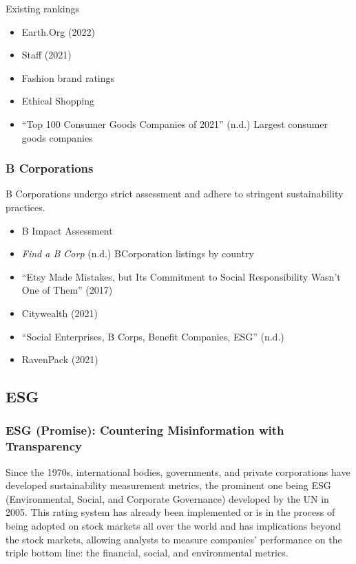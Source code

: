\documentclass[
  letterpaper,
  DIV=11,
  numbers=noendperiod]{scrartcl}
\providecommand{\tightlist}{%
  \setlength{\itemsep}{0pt}\setlength{\parskip}{0pt}}\usepackage{longtable,booktabs,array}
\begin{document}
Existing rankings

\begin{itemize}
\tightlist
\item
  Earth.Org (2022)
\item
  Staff (2021)
\item
  Fashion brand ratings
\item
  Ethical Shopping
\item
  {``Top 100 {Consumer Goods Companies} of 2021''} (n.d.) Largest
  consumer goods companies
\end{itemize}

\subsubsection{B Corporations}\label{b-corporations}

B Corporations undergo strict assessment and adhere to stringent
sustainability practices.

\begin{itemize}
\item
  B Impact Assessment
\item
  \emph{Find a {B Corp}} (n.d.) BCorporation listings by country
\item
  {``Etsy Made Mistakes, but Its Commitment to Social Responsibility
  Wasn't One of Them''} (2017)
\item
  Citywealth (2021)
\item
  {``Social {Enterprises}, {B Corps}, {Benefit Companies}, {ESG}''}
  (n.d.)
\item
  RavenPack (2021)
\end{itemize}

\subsection{ESG}\label{esg}

\subsubsection{ESG (Promise): Countering Misinformation with
Transparency}\label{esg-promise-countering-misinformation-with-transparency}

Since the 1970s, international bodies, governments, and private
corporations have developed sustainability measurement metrics, the
prominent one being ESG (Environmental, Social, and Corporate
Governance) developed by the UN in 2005. This rating system has already
been implemented or is in the process of being adopted on stock markets
all over the world and has implications beyond the stock markets,
allowing analysts to measure companies' performance on the triple bottom
line: the financial, social, and environmental metrics.
\end{document}
